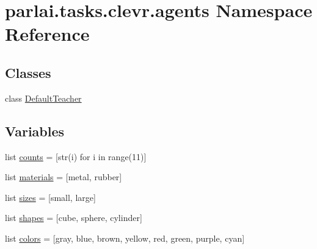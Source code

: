 \hypertarget{namespaceparlai_1_1tasks_1_1clevr_1_1agents}{}\section{parlai.\+tasks.\+clevr.\+agents Namespace Reference}
\label{namespaceparlai_1_1tasks_1_1clevr_1_1agents}
\subsection*{Classes}
\begin{DoxyCompactItemize}
\item 
class \hyperlink{classparlai_1_1tasks_1_1clevr_1_1agents_1_1DefaultTeacher}{Default\+Teacher}
\end{DoxyCompactItemize}
\subsection*{Variables}
\begin{DoxyCompactItemize}
\item 
list \hyperlink{namespaceparlai_1_1tasks_1_1clevr_1_1agents_addbc9f5c2379e29136fbbf55b1dfb333}{counts} = \mbox{[}str(i) for i in range(11)\mbox{]}
\item 
list \hyperlink{namespaceparlai_1_1tasks_1_1clevr_1_1agents_a73f08794aae5cb7c2a5cc9d1d662e082}{materials} = \mbox{[}\textquotesingle{}metal\textquotesingle{}, \textquotesingle{}rubber\textquotesingle{}\mbox{]}
\item 
list \hyperlink{namespaceparlai_1_1tasks_1_1clevr_1_1agents_a565c7b5d57a9f93a062d7a130f6ba989}{sizes} = \mbox{[}\textquotesingle{}small\textquotesingle{}, \textquotesingle{}large\textquotesingle{}\mbox{]}
\item 
list \hyperlink{namespaceparlai_1_1tasks_1_1clevr_1_1agents_ac54e3cd91825301baef61b929e13c0b4}{shapes} = \mbox{[}\textquotesingle{}cube\textquotesingle{}, \textquotesingle{}sphere\textquotesingle{}, \textquotesingle{}cylinder\textquotesingle{}\mbox{]}
\item 
list \hyperlink{namespaceparlai_1_1tasks_1_1clevr_1_1agents_a18c5435aea4ab46265cd4c70c7f04718}{colors} = \mbox{[}\textquotesingle{}gray\textquotesingle{}, \textquotesingle{}blue\textquotesingle{}, \textquotesingle{}brown\textquotesingle{}, \textquotesingle{}yellow\textquotesingle{}, \textquotesingle{}red\textquotesingle{}, \textquotesingle{}green\textquotesingle{}, \textquotesingle{}purple\textquotesingle{}, \textquotesingle{}cyan\textquotesingle{}\mbox{]}
\end{DoxyCompactItemize}



